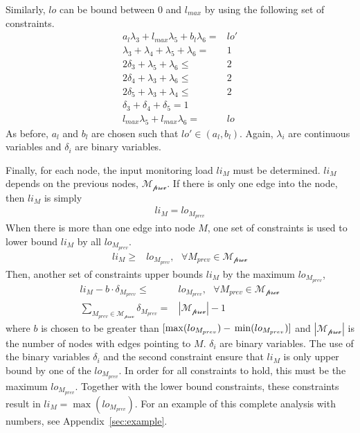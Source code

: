 Similarly, $lo$ can be bound between $0$ and $l_{max}$ by using the following
set of constraints.
\begin{align*}
a_l\lambda_3 + l_{max}\lambda_5 + b_l\lambda_6 =& lo'\\
\lambda_3 + \lambda_4 + \lambda_5 + \lambda_6 =& 1 \\
2 \delta_3 + \lambda_5 + \lambda_6 \leq& 2 \\
2 \delta_4 + \lambda_3 + \lambda_6 \leq& 2 \\
2 \delta_5 + \lambda_3 + \lambda_4 \leq& 2 \\
\delta_3 + \delta_4 + \delta_5 = 1 \\
l_{max}\lambda_5 + l_{max}\lambda_6 =& lo
\end{align*}
As before, $a_l$ and $b_l$ are chosen such that $lo' \in (a_l, b_l)$.
Again, $\lambda_i$ are continuous variables and $\delta_i$  are binary
variables.

Finally, for each node, the input monitoring load $li_{M}$ must be determined.
$li_{M}$ depends on the previous nodes, $\mathcal{M_\text{prev}}$. If there is only
one edge into the node, then $li_M$ is simply
\begin{align*}
li_{M} = lo_{M_{prev}}
\end{align*}
When there is more than one edge into node $M$, one set of constraints is used
to lower bound $li_{M}$ by all $lo_{M_{prev}}$.
\begin{align*}
  li_{M} \geq& lo_{M_{prev}}, \text{ } \forall M_{prev} \in \mathcal{M_\text{prev}}
\end{align*}
Then, another set of constraints upper bounds $li_{M}$ by the maximum $lo_{M_{prev}}$,
\begin{align*}
  li_{M} - b \cdot \delta_{M_{prev}} \leq& lo_{M_{prev}}, \text{ } \forall M_{prev} \in \mathcal{M_\text{prev}} \\
  \sum_{M_{prev} \in \mathcal{M_\text{prev}}}\delta_{M_{prev}} =& |\mathcal{M_\text{prev}}| - 1
\end{align*}
where $b$ is chosen to be greater than $[\max(lo_{M_{prev}}) -\\ \min(lo_{M_{prev}})]$ and
$|\mathcal{M_\text{prev}}|$ is the number of nodes with edges pointing to $M$. $\delta_i$ are binary
variables. The use of the binary variables $\delta_i$ and the second
constraint ensure that $li_{M}$ is only upper bound by one of the $lo_{M_{prev}}$. In
order for all constraints to hold, this must be the maximum $lo_{M_{prev}}$. Together
with the lower bound constraints, these constraints result in $li_{M} =
\max(lo_{M_{prev}})$. For an example of this complete analysis with numbers, see Appendix~\ref{sec:example}.


